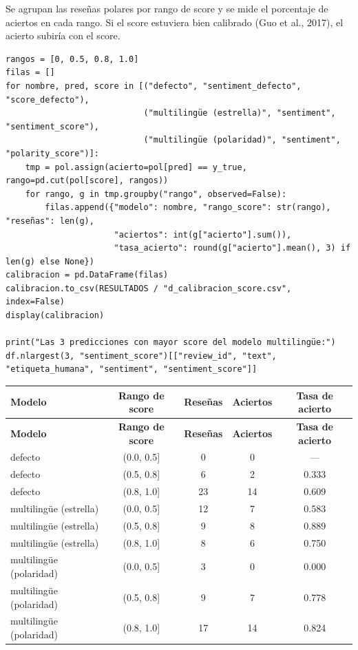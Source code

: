 \documentclass[12pt,a4paper]{article}
\begin{document}
Se agrupan las reseñas polares por rango de score y se mide el porcentaje de aciertos en cada
rango. Si el score estuviera bien calibrado (Guo et al., 2017), el acierto subiría con el score.

\begin{lstlisting}[style=codigo]
rangos = [0, 0.5, 0.8, 1.0]
filas = []
for nombre, pred, score in [("defecto", "sentiment_defecto", "score_defecto"),
                            ("multilingüe (estrella)", "sentiment", "sentiment_score"),
                            ("multilingüe (polaridad)", "sentiment", "polarity_score")]:
    tmp = pol.assign(acierto=pol[pred] == y_true, rango=pd.cut(pol[score], rangos))
    for rango, g in tmp.groupby("rango", observed=False):
        filas.append({"modelo": nombre, "rango_score": str(rango), "reseñas": len(g),
                      "aciertos": int(g["acierto"].sum()),
                      "tasa_acierto": round(g["acierto"].mean(), 3) if len(g) else None})
calibracion = pd.DataFrame(filas)
calibracion.to_csv(RESULTADOS / "d_calibracion_score.csv", index=False)
display(calibracion)

print("Las 3 predicciones con mayor score del modelo multilingüe:")
df.nlargest(3, "sentiment_score")[["review_id", "text", "etiqueta_humana", "sentiment", "sentiment_score"]]
\end{lstlisting}

{\footnotesize\renewcommand{\arraystretch}{1.3}
\begin{longtable}{|l|c|c|c|c|}
\hline
\textbf{Modelo} & \textbf{Rango de score} & \textbf{Reseñas} & \textbf{Aciertos} & \textbf{Tasa de acierto} \\ \hline
\endfirsthead
\hline
\textbf{Modelo} & \textbf{Rango de score} & \textbf{Reseñas} & \textbf{Aciertos} & \textbf{Tasa de acierto} \\ \hline
\endhead
defecto & (0.0, 0.5] & 0 & 0 & — \\ \hline
defecto & (0.5, 0.8] & 6 & 2 & 0.333 \\ \hline
defecto & (0.8, 1.0] & 23 & 14 & 0.609 \\ \hline
multilingüe (estrella) & (0.0, 0.5] & 12 & 7 & 0.583 \\ \hline
multilingüe (estrella) & (0.5, 0.8] & 9 & 8 & 0.889 \\ \hline
multilingüe (estrella) & (0.8, 1.0] & 8 & 6 & 0.750 \\ \hline
multilingüe (polaridad) & (0.0, 0.5] & 3 & 0 & 0.000 \\ \hline
multilingüe (polaridad) & (0.5, 0.8] & 9 & 7 & 0.778 \\ \hline
multilingüe (polaridad) & (0.8, 1.0] & 17 & 14 & 0.824 \\ \hline
\end{longtable}}
\end{document}
